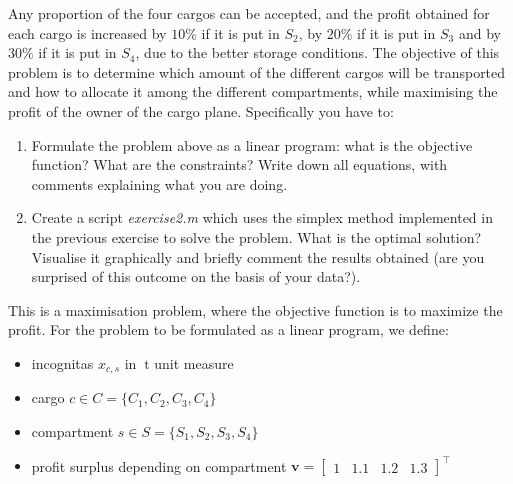 \documentclass[unicode,11pt,a4paper,oneside,numbers=endperiod,openany]{scrartcl}
\begin{document}
Any proportion of the four cargos can be accepted, and the profit obtained for each cargo is increased by $10\%$ if it is put in $S_2$, by $20\%$ if it is put in $S_3$ and by $30\%$ if it is put in $S_4$, due to the better storage conditions. The objective of this problem is to determine which amount of the different cargos will be transported and how to allocate it among the different compartments, while maximising the profit of the owner of the cargo plane. Specifically you have to:
\begin{enumerate}
	\item Formulate the problem above as a linear program: what is the objective function? What are the constraints? Write down all equations, with comments explaining what you are doing.
	\item Create a script \emph{exercise2.m} which uses the simplex method implemented in the previous exercise to solve the problem. What is the optimal solution? Visualise it graphically and briefly comment the results obtained (are you surprised of this outcome on the basis of your data?).
\end{enumerate}

\vspace{0.5cm}\noindent
This is a maximisation problem, where the objective function is to maximize the profit.
For the problem to be formulated as a linear program, we define:
\begin{itemize}
	\setlength\itemsep{0.1em}
	\item incognitas $x_{c,s}$ in $\SI{}{\tonne}$ unit measure
	\item cargo $c \in C = \{C_1, C_2, C_3, C_4\}$
	\item compartment $s \in S = \{S_1, S_2, S_3, S_4\}$
	\item profit surplus depending on compartment
	      $\mathbf{v} = \begin{bmatrix} 1 & 1.1 & 1.2 & 1.3\end{bmatrix}^{\top}$
\end{itemize}
\end{document}
